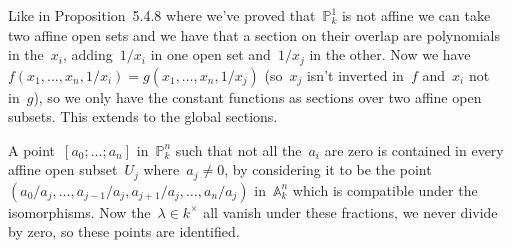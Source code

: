 \begin{exercise}
  Like in Proposition~5.4.8 where we've proved that~$\mathbb{P}_k^1$ is not affine we can take two affine open sets and we have that a section on their overlap are polynomials in the~$x_i$, adding~$1/x_i$ in one open set and~$1/x_j$ in the other. Now we have~$f(x_1,\ldots,x_n,1/x_i)=g(x_1,\ldots,x_n,1/x_j)$ (so~$x_j$ isn't inverted in~$f$ and~$x_i$ not in~$g$), so we only have the constant functions as sections over two affine open subsets. This extends to the global sections.
\end{exercise}

\begin{exercise}
  A point~$[a_0;\ldots;a_n]$ in~$\mathbb{P}_k^n$ such that not all the~$a_i$ are zero is contained in every affine open subset~$U_j$ where~$a_j\neq 0$, by considering it to be the point~$(a_0/a_j,\ldots,a_{j-1}/a_j,a_{j+1}/a_j,\ldots,a_n/a_j)$ in~$\mathbb{A}_k^n$ which is compatible under the isomorphisms. Now the~$\lambda\in k^{\times}$ all vanish under these fractions, we never divide by zero, so these points are identified.
\end{exercise}
